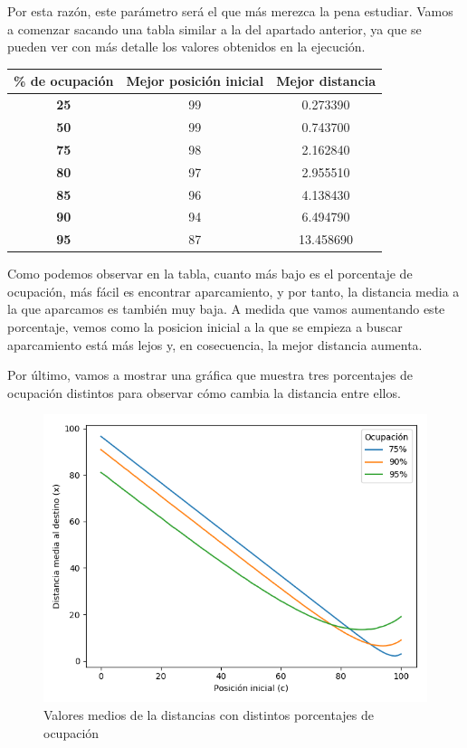 \documentclass[11pt,a4paper]{report}
\begin{document}
Por esta razón, este parámetro será el que más merezca la pena estudiar. Vamos a comenzar sacando una tabla similar a la del apartado
anterior, ya que se pueden ver con más detalle los valores obtenidos en la ejecución.

\begin{table}[H]
\centering
\begin{tabular}{c|cc}
\textbf{\% de ocupación} & \textbf{Mejor posición inicial} & \textbf{Mejor distancia} \\ \hline
\textbf{25}     		 & 99                              & 0.273390                 \\ \hline
\textbf{50}     		 & 99                              & 0.743700                 \\ \hline
\textbf{75}     		 & 98                              & 2.162840                 \\ \hline
\textbf{80}     		 & 97                              & 2.955510                 \\ \hline
\textbf{85}     		 & 96                              & 4.138430                 \\ \hline
\textbf{90}     		 & 94                              & 6.494790                 \\ \hline
\textbf{95}     		 & 87                              & 13.458690                \\
\end{tabular}
\end{table}

Como podemos observar en la tabla, cuanto más bajo es el porcentaje de ocupación, más fácil es encontrar aparcamiento, y por tanto,
la distancia media a la que aparcamos es también muy baja. A medida que vamos aumentando este porcentaje, vemos como la posicion
inicial a la que se empieza a buscar aparcamiento está más lejos y, en cosecuencia, la mejor distancia aumenta.

Por último, vamos a mostrar una gráfica que muestra tres porcentajes de ocupación distintos para observar cómo cambia la distancia
entre ellos.

\begin{figure}[H]
\centering
\includegraphics[scale=0.6]{img/x-100-2-75.png}
\caption{Valores medios de la distancias con distintos porcentajes de ocupación}
\end{figure}
\end{document}
